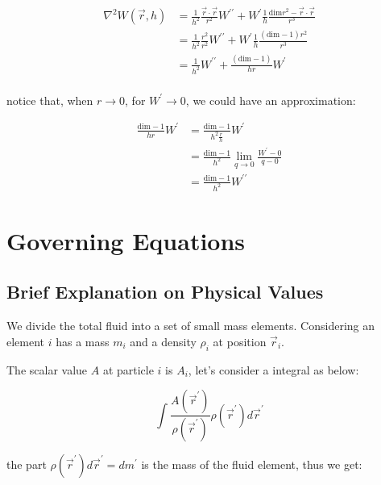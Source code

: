 \documentclass[10pt, oneside]{article}
\begin{document}
\begin{equation}
    \begin{aligned}
        \nabla^2 W(\vec{r}, h) &= \frac{1}{h^2}\frac{\vec{r}\cdot\vec{r}}{r^2}W^{\prime\prime}+
        W^\prime\frac{1}{h}\frac{\text{dim}r^2-\vec{r}\cdot\vec{r}}{r^3}\\
        &=\frac{1}{h^2}\frac{r^2}{r^2}W^{\prime\prime}+
        W^\prime\frac{1}{h}\frac{(\text{dim}-1)r^2}{r^3}\\
        &=\frac{1}{h^2}W^{\prime\prime}+
        \frac{(\text{dim}-1)}{hr}W^\prime\\
    \end{aligned}
\end{equation}

notice that, when $r\to 0$, for $W^{\prime}\to 0$, we could have an approximation:

\begin{equation}
    \begin{aligned}
        \frac{\text{dim}-1}{hr}W^\prime &=
        \frac{\text{dim}-1}{h^2\frac{r}{h}}W^\prime\\
        &=\frac{\text{dim}-1}{h^2}\lim_{q\to 0}\frac{W^\prime-0}{q-0}\\
        &=\frac{\text{dim}-1}{h^2}W^{\prime\prime}
    \end{aligned}
\end{equation}

\section{Governing Equations}

\subsection{Brief Explanation on Physical Values}

We divide the total fluid into a set of small mass elements. 
Considering an element $i$ has a mass $m_i$ and a density $\rho_i$ at position $\vec{r}_i$.

The scalar value $A$ at particle $i$ is $A_i$, let's consider a integral as below:

\begin{equation}
    \int \frac{A(\vec{r}^\prime)}{\rho(\vec{r}^\prime)}\rho(\vec{r}^\prime)d\vec{r}^\prime
\end{equation}

the part $\rho(\vec{r}^\prime)d\vec{r}^\prime=dm^\prime$ is the mass of the fluid element, 
thus we get:
\end{document}
